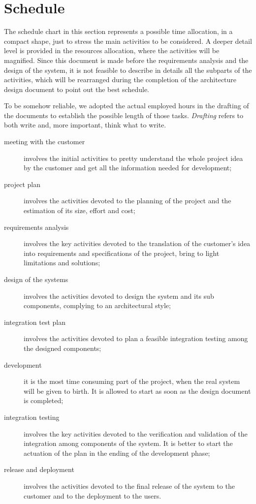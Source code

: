 \documentclass{scrreprt}
\begin{document}
\chapter{Schedule}
The schedule chart in this section represents a possible time allocation, in a compact shape, just to stress the main activities to be considered. A deeper detail level is provided in the resources allocation, where the activities will be magnified.
Since this document is made before the requirements analysis and the design of the system, it is not feasible to describe in details all the subparts of the activities, which will be rearranged during the completion of the architecture design document to point out the best schedule.

To be somehow reliable, we adopted the actual employed hours in the drafting of the documents to establish the possible length of those tasks. \emph{Drafting} refers to both write and, more important, think what to write.

\begin{description}
\item[meeting with the customer] involves the initial activities to pretty understand the whole project idea by the customer and get all the information needed for development;
\item[project plan] involves the activities devoted to the planning of the project and the estimation of its size, effort and cost;
\item[requirements analysis] involves the key activities devoted to the translation of the customer's idea into requirements and specifications of the project, bring to light limitations and solutions;
\item[design of the systems] involves the activities devoted to design the system and its sub components, complying to an architectural style;
\item[integration test plan] involves the activities devoted to plan a feasible integration testing among the designed components;
\item[development] it is the most time consuming part of the project, when the real system will be given to birth. It is allowed to start as soon as the design document is completed;
\item[integration testing] involves the key activities devoted to the verification and validation of the integration among components of the system. It is better to start the actuation of the plan in the ending of the development phase;
\item[release and deployment] involves the activities devoted to the final release of the system to the customer and to the deployment to the users.
\end{description}
\end{document}
